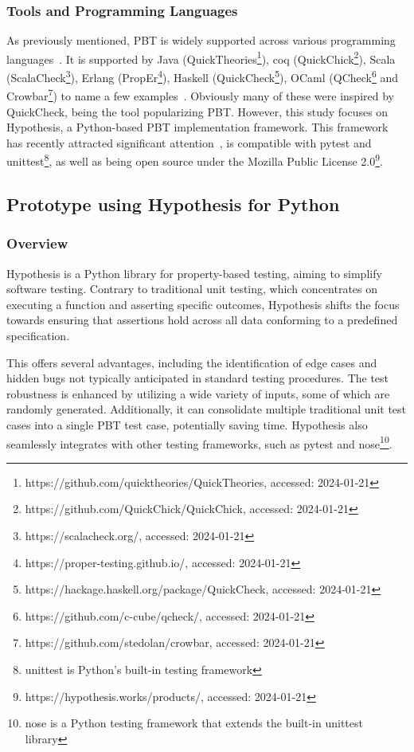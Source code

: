 \documentclass[runningheads]{llncs}
\begin{document}
\subsubsection{Tools and Programming Languages}
As previously mentioned, PBT is widely supported across various programming languages~\cite{Chen2022,Shi2023}. It is supported by Java (QuickTheories\footnote{https://github.com/quicktheories/QuickTheories, accessed: 2024-01-21}), coq (QuickChick\footnote{https://github.com/QuickChick/QuickChick, accessed: 2024-01-21}), Scala (ScalaCheck\footnote{https://scalacheck.org/, accessed: 2024-01-21}), Erlang (PropEr\footnote{https://proper-testing.github.io/, accessed: 2024-01-21}), Haskell (QuickCheck\footnote{https://hackage.haskell.org/package/QuickCheck, accessed: 2024-01-21}), OCaml (QCheck\footnote{https://github.com/c-cube/qcheck/, accessed: 2024-01-21} and Crowbar\footnote{https://github.com/stedolan/crowbar, accessed: 2024-01-21}) to name a few examples~\cite{MacIver2016,Padhye2019,Paraskevopoulou2015,Arts2008,Papadakis2011,Claessen2000}. Obviously many of these were inspired by QuickCheck, being the tool popularizing PBT. However, this study focuses on Hypothesis, a Python-based PBT implementation framework. This framework has recently attracted significant attention~\cite{Corgozinho2023,MacIver2019}, is compatible with pytest and unittest\footnote{unittest is Python's built-in testing framework}, as well as being open source under the Mozilla Public License 2.0\footnote{https://hypothesis.works/products/, accessed: 2024-01-21}.

\subsection{Prototype using Hypothesis for Python}
\subsubsection{Overview}
Hypothesis is a Python library for property-based testing, aiming to simplify software testing. Contrary to traditional unit testing, which concentrates on executing a function and asserting specific outcomes, Hypothesis shifts the focus towards ensuring that assertions hold across all data conforming to a predefined specification.

This offers several advantages, including the identification of edge cases and hidden bugs not typically anticipated in standard testing procedures. The test robustness is enhanced by utilizing a wide variety of inputs, some of which are randomly generated. Additionally, it can consolidate multiple traditional unit test cases into a single PBT test case, potentially saving time. Hypothesis also seamlessly integrates with other testing frameworks, such as pytest and nose\footnote{nose is a Python testing framework that extends the built-in unittest library}.
\end{document}
